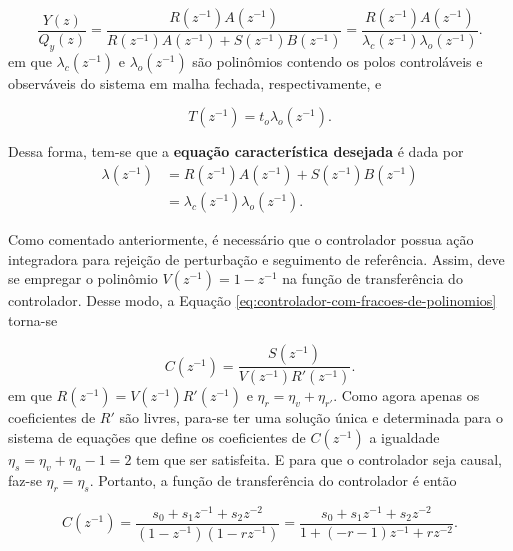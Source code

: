 \begin{equation}
    \label{eq:ft-da-saida-para-perturbacao-na-saída}
    \frac{Y(z)}{Q_{y}(z)} = \frac{R(z^{-1})A(z^{-1})}
                                 {R(z^{-1})A(z^{-1})+S(z^{-1})B(z^{-1})}
                          = \frac{R(z^{-1})A(z^{-1})}
                                 {\lambda_{c}(z^{-1})\lambda_{o}(z^{-1})}.
\end{equation} em que $\lambda_{c}(z^{-1})$ e $\lambda_{o}(z^{-1})$ são polinômios
contendo os polos controláveis e observáveis do sistema em malha fechada,
respectivamente, e 

\begin{equation}
    \label{eq:numerador-do-filtro-de-referencia}
    T(z^{-1}) = t_{o}\lambda_{o}(z^{-1}).
\end{equation}

Dessa forma, tem-se que a \textbf{equação característica desejada} é dada por
\begin{equation}
    \label{eq:equacao-caracteristica-sem-coeficientes}
    \begin{split}
        \lambda(z^{-1}) &= R(z^{-1})A(z^{-1})+S(z^{-1})B(z^{-1}) \\
                        &= \lambda_{c}(z^{-1})\lambda_{o}(z^{-1}).
    \end{split}
\end{equation}

Como comentado anteriormente, é necessário que o controlador possua ação
integradora para rejeição de perturbação e seguimento de referência. Assim, deve
se empregar o polinômio $V(z^{-1}) = 1 - z^{-1}$ na função de transferência do
controlador. Desse modo, a Equação
\ref{eq:controlador-com-fracoes-de-polinomios} torna-se

\begin{equation}
    \label{eq:controlador-com-fracoes-de-polinomios-com-integrador}
    C(z^{-1}) = \frac{S(z^{-1})}{V(z^{-1})R'(z^{-1})}.
\end{equation} em que $R(z^{-1}) = V(z^{-1})R'(z^{-1})$ e
$\eta_r = \eta_v + \eta_{r'}$. Como agora apenas os coeficientes de $R'$ são
livres, para-se ter uma solução única e determinada para o sistema de equações
que define os coeficientes de $C(z^{-1})$ a igualdade $\eta_s = \eta_v + \eta_a
- 1 = 2$ tem que ser satisfeita. E para que o controlador seja causal, faz-se
$\eta_r = \eta_s$. Portanto, a função de transferência do controlador é então

\begin{equation}
    C(z^{-1}) = \frac{s_0+s_1z^{-1}+s_2z^{-2}}{(1-z^{-1})(1-rz^{-1})} 
              = \frac{s_0+s_1z^{-1}+s_2z^{-2}}{1+(-r-1)z^{-1}+rz^{-2}}.
\end{equation}

